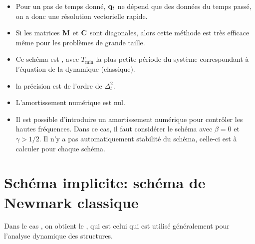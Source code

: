 \begin{itemize}
   \item Pour un pas de temps donné, $\VV{q}_t$ ne dépend que des données du temps passé,
	on a donc une résolution vectorielle rapide.
   \item Si les matrices $\MM{M}$ et $\MM{C}$ sont diagonales, alors cette méthode est très efficace
	même pour les problèmes de grande taille.
   \item Ce schéma est ,
	avec $T_{\min}$ la plus petite période du système correspondant à l'équation
	de la dynamique (classique).
   \item la précision est de l'ordre de $\Delta_t^2$.
   \item L'amortissement numérique est nul.
   \item Il est possible d'introduire un amortissement numérique pour contrôler les hautes
	fréquences. Dans ce cas, il faut considérer le schéma avec $\beta=0$ et $\gamma>1/2$.
	Il n'y a pas automatiquement stabilité du schéma, celle-ci est à calculer pour chaque
	schéma.
\end{itemize}
\bigskip
\section{Schéma implicite: schéma de Newmark classique}

Dans le cas , on obtient le ,
qui est celui qui est utilisé généralement pour l'analyse dynamique des structures.

